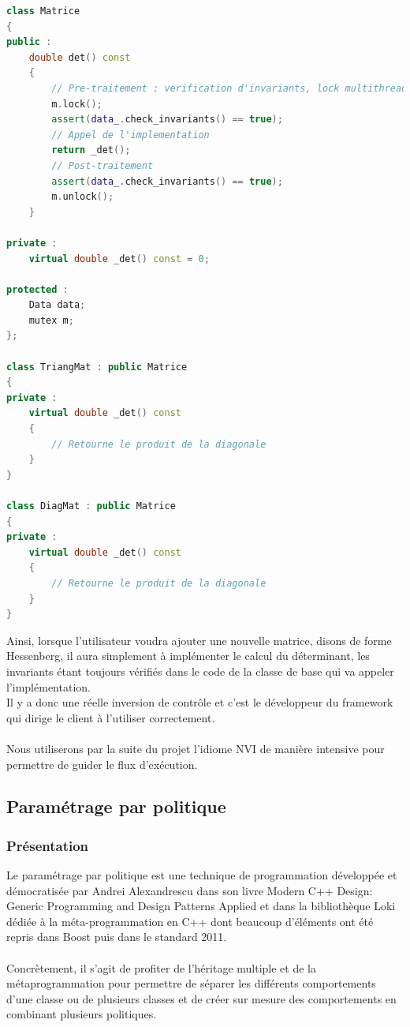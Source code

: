\begin{lstlisting}[label=nvi_code,caption=NVI : principe.,language=C++]
class Matrice
{
public :
    double det() const
    {
        // Pre-traitement : verification d'invariants, lock multithread, etc.
        m.lock();
        assert(data_.check_invariants() == true);
        // Appel de l'implementation
        return _det();
        // Post-traitement
        assert(data_.check_invariants() == true);
        m.unlock();
    }
    
private :
    virtual double _det() const = 0;
    
protected :
    Data data;
    mutex m;
};

class TriangMat : public Matrice
{
private :
    virtual double _det() const 
    {
        // Retourne le produit de la diagonale
    }
}

class DiagMat : public Matrice
{
private :
    virtual double _det() const 
    {
        // Retourne le produit de la diagonale
    }
}
\end{lstlisting}

Ainsi, lorsque l'utilisateur voudra ajouter une nouvelle matrice, disons de forme Hessenberg, il aura simplement à implémenter le calcul du déterminant, les invariants étant toujours vérifiés dans le code de la classe de base qui va appeler l'implémentation.\\
Il y a donc une réelle inversion de contrôle et c'est le développeur du framework qui dirige le client à l'utiliser correctement.\\\\

Nous utiliserons par la suite du projet l'idiome NVI de manière intensive pour permettre de guider le flux d'exécution.

\subsection{Paramétrage par politique}
\subsubsection{Présentation}
Le paramétrage par politique est une technique de programmation développée et démocratisée par Andrei Alexandrescu dans son livre Modern C++ Design: Generic Programming and Design Patterns Applied et dans la bibliothèque Loki dédiée à la méta-programmation en C++ dont beaucoup d'éléments ont été repris dans Boost puis dans le standard 2011.\\\\
Concrètement, il s'agit de profiter de l'héritage multiple et de la métaprogrammation pour permettre de séparer les différents comportements d'une classe ou de plusieurs classes et de créer sur mesure des comportements en combinant plusieurs politiques.

